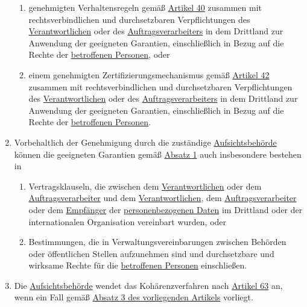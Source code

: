 \begin{enumerate}
\begin{enumerate}
    \item genehmigten Verhaltensregeln gemäß \hyperref[ch:40]{Artikel 40} zusammen mit rechtsverbindlichen und
     durchsetzbaren Verpflichtungen des \hyperref[itm:04-7]{Verantwortlichen} oder des \hyperref[itm:04-8]
     {Auftragsverarbeiters} in dem Drittland zur Anwendung der geeigneten Garantien, einschließlich in Bezug auf die
     Rechte der \hyperref[itm:04-1]{betroffenen Personen}, oder
    \label{itm:46-2e}

    \item einem genehmigten Zertifizierungsmechanismus gemäß \hyperref[ch:42]{Artikel 42} zusammen mit
     rechtsverbindlichen und durchsetzbaren Verpflichtungen des \hyperref[itm:04-7]{Verantwortlichen} oder
     des \hyperref[itm:04-8]{Auftragsverarbeiters} in dem Drittland zur Anwendung der geeigneten Garantien,
     einschließlich in Bezug auf die Rechte der \hyperref[itm:04-1]{betroffenen Personen}.
    \label{itm:46-2f}

  \end{enumerate}

  \item Vorbehaltlich der Genehmigung durch die zuständige \hyperref[itm:04-21]{Aufsichtsbehörde} können die geeigneten
   Garantien gemäß
   \hyperref[itm:46-1]{Absatz 1} auch insbesondere bestehen in
  \label{itm:46-3}

  \begin{enumerate}
  
    \item Vertragsklauseln, die zwischen dem \hyperref[itm:04-7]{Verantwortlichen} oder dem \hyperref[itm:04-8]
     {Auftragsverarbeiter} und dem \hyperref[itm:04-7]{Verantwortlichen}, dem
     \hyperref[itm:04-8]{Auftragsverarbeiter} oder dem \hyperref[itm:04-9]{Empfänger} der \hyperref[itm:04-1]
      {personenbezogenen Daten} im Drittland oder der internationalen Organisation vereinbart wurden, oder
    \label{itm:46-3a}

    \item Bestimmungen, die in Verwaltungsvereinbarungen zwischen Behörden oder öffentlichen Stellen aufzunehmen sind
     und durchsetzbare und wirksame Rechte für die \hyperref[itm:04-1]{betroffenen Personen} einschließen.
    \label{itm:46-3b}

  \end{enumerate}

  \item Die \hyperref[itm:04-21]{Aufsichtsbehörde} wendet das Kohärenzverfahren nach \hyperref[ch:63]{Artikel 63} an,
   wenn ein Fall gemäß
   \hyperref[itm:46-3]{Absatz 3 des vorliegenden Artikels} vorliegt.
  \label{itm:46-4}


\end{enumerate}
